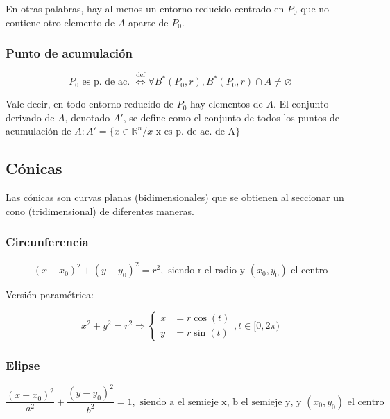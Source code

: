 \documentclass{article}
\renewcommand{\Bbb}{\mathbb}
\begin{document}
En otras palabras, hay al menos un entorno reducido centrado en $P_0$ que no contiene otro elemento de $A$ aparte de $P_0$.

\subsubsection{Punto de acumulación}

\begin{equation}
P_0 \text{ es p. de ac. } \overset{\text{def}}{\Longleftrightarrow} \forall B^*(P_0, r), B^*(P_0, r) \cap A \neq \varnothing
\end{equation}


Vale decir, en todo entorno reducido de $P_0$ hay elementos de $A$. El conjunto derivado de $A$, denotado $A'$, se define como el conjunto de todos los puntos de acumulación de $A: A' = \{ x \in \Bbb R^n / x \text{ x es p. de ac. de A} \}$

\subsection{Cónicas}

Las cónicas son curvas planas (bidimensionales) que se obtienen al seccionar un cono (tridimensional) de diferentes maneras.

\subsubsection{Circunferencia}

\begin{equation}
(x-x_0)^2 + (y-y_0)^2 = r^2, \text{ siendo r el radio y } (x_0, y_0) \text{ el centro}
\end{equation}

Versión paramétrica:

\begin{equation}
x^2 + y^2 = r^2 \Rightarrow
\left\{
\begin{array}{ll}
x &= r \cos(t) \\
y &= r \sin(t)
\end{array}
\right., t \in [0, 2\pi)
\end{equation}

\subsubsection{Elipse}

\begin{equation}
\frac{(x-x_0)^2}{a^2} + \frac{(y-y_0)^2}{b^2} = 1, \text{ siendo a el semieje x, b el semieje y, y } (x_0, y_0) \text{ el centro}
\end{equation}
\end{document}
